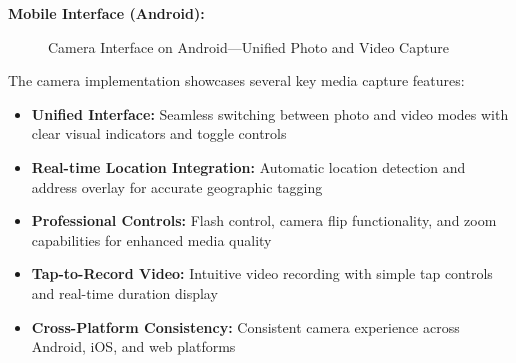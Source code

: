 \textbf{Mobile Interface (Android):}
\begin{figure}[!htbp]
    \centering
    \hspace{0.02\textwidth}
    \caption{Camera Interface on Android---Unified Photo and Video Capture}\label{fig:android_camera}
\end{figure}

The camera implementation showcases several key media capture features:
\begin{itemize}
    \item \textbf{Unified Interface:} Seamless switching between photo and video modes with clear visual indicators and toggle controls
    \item \textbf{Real-time Location Integration:} Automatic location detection and address overlay for accurate geographic tagging
    \item \textbf{Professional Controls:} Flash control, camera flip functionality, and zoom capabilities for enhanced media quality
    \item \textbf{Tap-to-Record Video:} Intuitive video recording with simple tap controls and real-time duration display
    \item \textbf{Cross-Platform Consistency:} Consistent camera experience across Android, iOS, and web platforms
\end{itemize}
